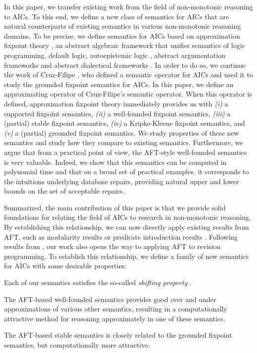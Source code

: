 In this paper, we transfer existing work from the field of non-monotonic reasoning to AICs. 
To this end, we define a new class of semantics for AICs that are natural counterparts of existing semantics in various non-monotonic reasoning domains. 
To be precise, we define semantics for AICs based on approximation fixpoint theory , an abstract algebraic framework that unifies semantics of logic programming, default logic, autoepistemic logic , abstract argumentation frameworks  and abstract dialectical frameworks . 
In order to do so, we continue the work of Cruz-Filipe \cite{iclp/Cruz-Filipe16}, who defined a semantic operator for AICs and used it to study the grounded fixpoint semantics  for AICs. 
In this paper, we define an approximating operator of Cruz-Filipe's semantic operator. 
When this operator is defined, approximation fixpoint theory immediately provides us with \textit{(i)} a supported fixpoint semantics, \textit{(ii)} a well-founded fixpoint semantics, \textit{(iii)} a (partial) stable fixpoint semantics, \textit{(iv)} a Kripke-Kleene fixpoint semantics, and \textit{(v)} a (partial) grounded fixpoint semantics. 
We study properties of these new semantics and study how they compare to existing semantics. 
Furthermore, we argue that from a practical point of view, the AFT-style well-founded semantics is very valuable. 
Indeed, we show that this semantics can be computed in polynomial time and that on a broad set of practical examples, it corresponds to the intuitions underlying database repairs,  providing natural upper and lower bounds on the set of acceptable repairs.  

Summarized, the main contribution of this paper is that we provide solid foundations for relating the field of AICs to research in non-monotonic reasoning. 
By establishing this relationship, we can now directly apply existing results from AFT, such as modularity results \cite{tocl/VennekensGD06,tocl/BogaertsVD16} or predicate introduction results \cite{VennekensMWD07a,VennekensMWD07b}. 
Following results from \citet{tplp/CaropreseT11}, our work also opens the way to applying AFT to revision programming. 
To establish this relationship, we define a family of new semantics for AICs with some desirable properties:
\begin{compactitem}
 \item Each of our semantics satisfies the so-called \emph{shifting property} \cite{tcs/MarekT98}. 
 \item The AFT-based well-founded semantics provides good over and under approximations of various other semantics, resulting in a computationally attractive method for reasoning approximately in one of these semantics. 
 \item The AFT-based stable semantics is closely related to the grounded fixpoint semantics, but computationally more attractive.
\end{compactitem}

